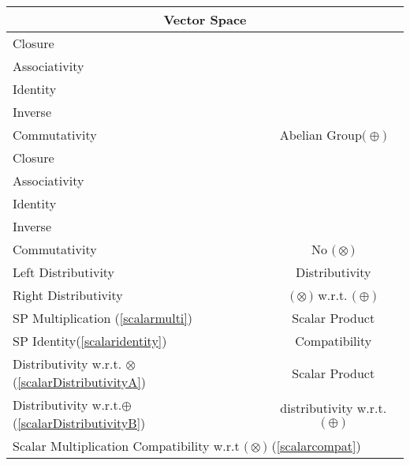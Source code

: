 \documentclass[a4paper,12pt]{scrartcl}    %
\newcommand{\OpA}{\otimes}
\newcommand{\OpB}{\oplus}
\begin{document}
\begin{minipage}[c]{0,5\textwidth}

\begin{tabular}{|l|c|} %
  \hline
  \multicolumn{2}{c}{\cellcolor{green!25}Vector Space} \\
  \hline
    \cellcolor{blue!25} \footnotesize Closure& \cellcolor{yellow!25}  \\
    \cellcolor{blue!25} \footnotesize Associativity& \cellcolor{yellow!25}  \\
    \cellcolor{blue!25} \footnotesize Identity& \cellcolor{yellow!25} \\
    \cellcolor{blue!25} \footnotesize Inverse& \cellcolor{yellow!25} \\
    \cellcolor{blue!25} \footnotesize Commutativity& \multirow{-5}{*}{\tiny\cellcolor{yellow!25}Abelian Group$\big(\OpB\big)$} \\
   \hline
    \cellcolor{red!25} \footnotesize Closure& \cellcolor{red!25}  \\
    \cellcolor{red!25} \footnotesize Associativity& \cellcolor{red!25}  \\
    \cellcolor{red!25} \footnotesize Identity& \cellcolor{red!25} \\
    \cellcolor{red!25} \footnotesize Inverse& \cellcolor{red!25} \\
    \cellcolor{red!25} \footnotesize Commutativity& \multirow{-5}{*}{\tiny\cellcolor{red!25} No $\big(\OpA\big)$} \\
  \hline
  	\cellcolor{red!25} \footnotesize Left Distributivity&  \tiny\cellcolor{red!25}Distributivity\\
    \cellcolor{red!25} \footnotesize Right Distributivity & \tiny\cellcolor{red!25} $\big(\OpA\big)$ w.r.t. $\big(\OpB\big)$  \\
   \hline
  \hline
     \cellcolor{blue!25} \footnotesize SP Multiplication (\ref{scalarmulti})&  \tiny\cellcolor{yellow!25}Scalar Product\\
    \cellcolor{blue!25} \footnotesize SP Identity(\ref{scalaridentity}) & \tiny\cellcolor{yellow!25} Compatibility  \\
   \hline 
    \cellcolor{blue!25} \footnotesize Distributivity w.r.t. $\OpA$ (\ref{scalarDistributivityA})&  \tiny\cellcolor{yellow!25}Scalar Product\\
    \cellcolor{blue!25} \footnotesize Distributivity w.r.t.$\OpB$ (\ref{scalarDistributivityB}) & \tiny\cellcolor{yellow!25} distributivity w.r.t. $\big(\OpB\big)$  \\
   \hline
    \multicolumn{2}{l}{\footnotesize \cellcolor{red!25} Scalar Multiplication Compatibility w.r.t  $\big(\OpA\big)$ (\ref{scalarcompat})}\\
   \hline
\end{tabular}


\end{minipage}
\end{document}
